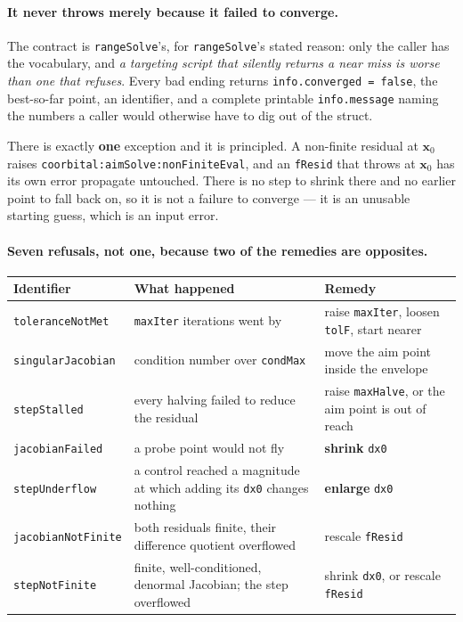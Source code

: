 \documentclass[11pt]{article}
\newcommand{\code}[1]{\texttt{#1}}
\begin{document}
\paragraph{It never throws merely because it failed to converge.} The contract
is \code{rangeSolve}'s, for \code{rangeSolve}'s stated reason: only the caller
has the vocabulary, and \emph{a targeting script that silently returns a near
miss is worse than one that refuses}. Every bad ending returns
\code{info.converged = false}, the best-so-far point, an identifier, and a
complete printable \code{info.message} naming the numbers a caller would
otherwise have to dig out of the struct.

There is exactly \textbf{one} exception and it is principled. A non-finite
residual at $\mathbf{x}_0$ raises
\code{coorbital:aimSolve:nonFiniteEval}, and an \code{fResid} that throws at
$\mathbf{x}_0$ has its own error propagate untouched. There is no step to
shrink there and no earlier point to fall back on, so it is not a failure to
converge --- it is an unusable starting guess, which is an input error.

\paragraph{Seven refusals, not one, because two of the remedies are opposites.}

\begin{center}
\begin{tabular}{lp{5.6cm}p{4.3cm}}
\toprule
Identifier & What happened & Remedy \\
\midrule
\code{toleranceNotMet}    & \code{maxIter} iterations went by                       & raise \code{maxIter}, loosen \code{tolF}, start nearer \\
\code{singularJacobian}   & condition number over \code{condMax}                    & move the aim point inside the envelope \\
\code{stepStalled}        & every halving failed to reduce the residual             & raise \code{maxHalve}, or the aim point is out of reach \\
\code{jacobianFailed}     & a probe point would not fly                             & \textbf{shrink} \code{dx0} \\
\code{stepUnderflow}      & a control reached a magnitude at which adding its \code{dx0} changes nothing & \textbf{enlarge} \code{dx0} \\
\code{jacobianNotFinite}  & both residuals finite, their difference quotient overflowed & rescale \code{fResid} \\
\code{stepNotFinite}      & finite, well-conditioned, denormal Jacobian; the step overflowed & shrink \code{dx0}, or rescale \code{fResid} \\
\bottomrule
\end{tabular}
\end{center}
\end{document}
